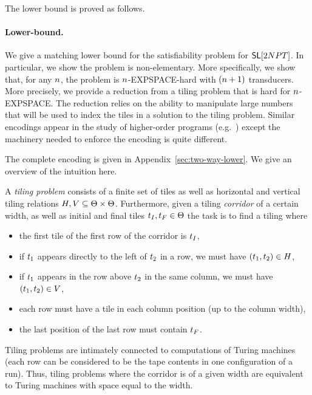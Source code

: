 The lower bound is proved as follows. 


\paragraph{Lower-bound.}

We give a matching lower bound for the satisfiability problem for $\mathsf{SL}[2NPT]$. 
In particular, we show the problem is non-elementary.
More specifically, we show that, for any $n$, the problem is $n$-EXPSPACE-hard with $(n+1)$ transducers. 
More precisely, we provide a  reduction from a tiling problem that is hard for $n$-EXPSPACE.
The reduction relies on the ability to manipulate large numbers that will be used to index the tiles in a solution to the tiling problem.
Similar encodings appear in the study of higher-order programs (e.g.~\cite{J01,CW07}) except the machinery needed to enforce the encoding is quite different.

The complete encoding is given in 
          {Appendix~\ref{sec:two-way-lower}}.
We give an overview of the intuition here.

A \emph{tiling problem} consists of a finite set of tiles \tiles as well as horizontal and vertical tiling relations 
$H, V \subseteq \Theta \times \Theta$.
Furthermore, given a tiling \emph{corridor} of a certain width, as well as initial and final tiles
$t_I, t_F \in \Theta$
the task is to find a tiling where 
\begin{itemize}
\item
    the first tile of the first row of the corridor is $t_I$, 
\item
    if $t_1$ appears directly to the left of $t_2$ in a row, we must have
    $\left( t_1, t_2 \right) \in H$,
\item
    if $t_1$ appears in the row above $t_2$ in the same column, we must have
    $\left( t_1, t_2 \right) \in V$,
\item
    each row must have a tile in each column position (up to the column width),
\item
    the last position of the last row must contain $t_F$.
\end{itemize}
Tiling problems are intimately connected to computations of Turing machines 
(each row can be considered to be the tape contents in one configuration of a run).
Thus, tiling problems where the corridor is of a given width are equivalent to Turing machines with space equal to the width.

